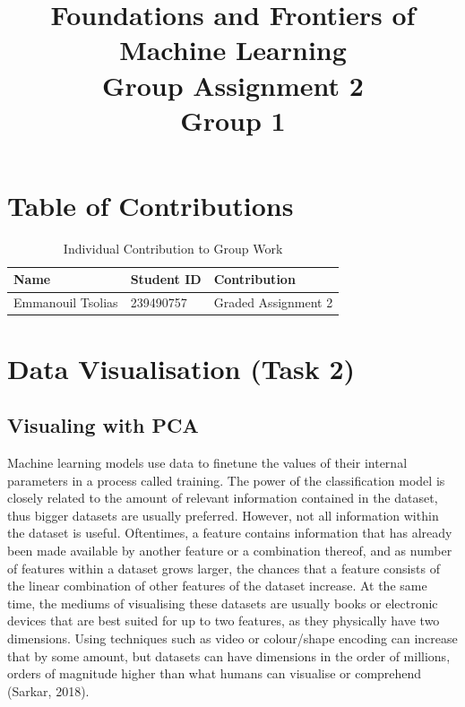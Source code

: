 \documentclass{article}
\begin{document}
\title{Foundations and Frontiers of Machine Learning\\Group Assignment 2\\Group 1}
\author{}
\date{}
\maketitle

\tableofcontents
\newpage

\listoffigures
\listoftables
\newpage

\section{Table of Contributions}

\begin{table}[h!]
    \centering
    \begin{tabular}{|l|l|l|}
        \hline
        \textbf{Name} & \textbf{Student ID} & \textbf{Contribution} \\ \hline
        Emmanouil Tsolias       & 239490757 & Graded Assignment 2 \\ \hline
    \end{tabular}
    \caption{Individual Contribution to Group Work}
    \label{tab:contributions}
\end{table}
\newpage

\section{Data Visualisation (Task 2)}
\subsection{Visualing with PCA}

Machine learning models use data to finetune the values of their internal parameters in a process called training.
The power of the classification model is closely related to the amount of relevant information contained in the dataset, thus bigger datasets are usually preferred.
However, not all information within the dataset is useful.
Oftentimes, a feature contains information that has already been made available by another feature or a combination thereof, and as number of features within a dataset grows larger, the chances that a feature consists of the linear combination of other features of the dataset increase.
At the same time, the mediums of visualising these datasets are usually books or electronic devices that are best suited for up to two features, as they physically have two dimensions.
Using techniques such as video or colour/shape encoding can increase that by some amount, but datasets can have dimensions in the order of millions, orders of magnitude higher than what humans can visualise or comprehend (Sarkar, 2018).
\end{document}
